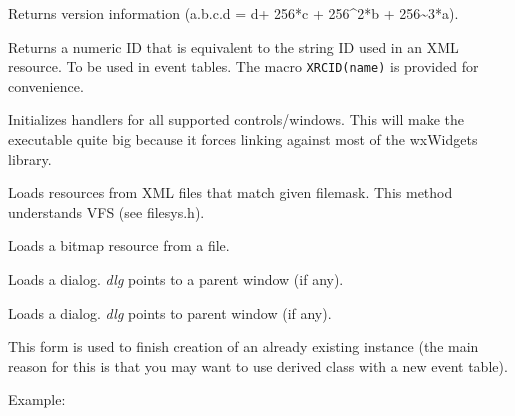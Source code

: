 \label{wxxmlresourcegetversion}


Returns version information (a.b.c.d = d+ 256*c + 256\textasciicircum2*b + 256\textasciitilde3*a).

\label{wxxmlresourcegetxmlid}


Returns a numeric ID that is equivalent to the string ID used in an XML
resource. To be used in event tables.
The macro {\tt XRCID(name)} is provided for convenience.

\label{wxxmlresourceinitallhandlers}


Initializes handlers for all supported controls/windows. This will
make the executable quite big because it forces linking against
most of the wxWidgets library.

\label{wxxmlresourceload}


Loads resources from XML files that match given filemask.
This method understands VFS (see filesys.h).

\label{wxxmlresourceloadbitmap}


Loads a bitmap resource from a file.

\label{wxxmlresourceloaddialog}


Loads a dialog. {\it dlg} points to a parent window (if any).


Loads a dialog. {\it dlg} points to parent window (if any).

This form is used to finish creation of an already existing instance (the main reason
for this is that you may want to use derived class with a new event table).

Example:

